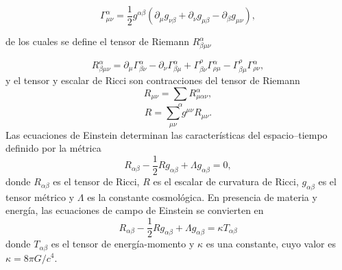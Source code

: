\documentclass[a4paper,openright,12pt]{book}
\begin{document}
\begin{equation*}
\Gamma^{\alpha}_{\mu \nu} = 
\frac{1}{2}g^{\alpha \beta}\left(\partial_{\mu}g_{\nu \beta} +
\partial_{\nu}g_{\mu \beta} - \partial_{\beta}g_{\mu \nu}\right), 
\end{equation*}

de los cuales se define el tensor de Riemann $R^{\alpha}_{\beta \mu \nu}$

\begin{equation*}
R^{\alpha}_{\beta \mu \nu}
=
\partial_{\mu}\Gamma^{\alpha}_{\beta \nu}
-
\partial_{\nu}\Gamma^{\alpha}_{\beta \mu}
+
\Gamma^{\rho}_{\beta \nu}\Gamma^{\alpha}_{\rho \mu}
-
\Gamma^{\rho}_{\beta \mu}\Gamma^{\alpha}_{\rho \nu},
\end{equation*}
y el tensor y escalar de Ricci son contracciones del tensor de Riemann
\begin{equation*}
R_{\mu \nu} = \sum_{\alpha}R^{\alpha}_{\mu \alpha \nu},
\end{equation*}
\begin{equation*}
R = \sum_{\mu \nu}g^{\mu \nu}R_{\mu \nu}.
\end{equation*}
Las ecuaciones de Einstein determinan las características del espacio--tiempo definido por la métrica
\begin{equation}
R_{\alpha \beta} - \frac{1}{2} R g_{\alpha \beta} + \Lambda g_{\alpha \beta} = 0,\label{eqn 1.12}
\end{equation}
donde $R_{\alpha \beta}$ es el tensor de Ricci, $R$ es el escalar de curvatura de Ricci, $g_{\alpha \beta}$ es el tensor métrico y $\Lambda$ es la constante cosmológica. En presencia de materia y energía, las ecuaciones de campo de Einstein se convierten en \cite{1.4}
\begin{equation}
R_{\alpha \beta} - \frac{1}{2} R g_{\alpha \beta} + \Lambda g_{\alpha \beta} = \kappa T_{\alpha \beta}\label{eqn 1.13}
\end{equation}
donde $T_{\alpha \beta}$ es el tensor de energía-momento y $\kappa$ es una constante, cuyo valor es $\kappa = 8 \pi G / c^{4}$.

\end{document}

